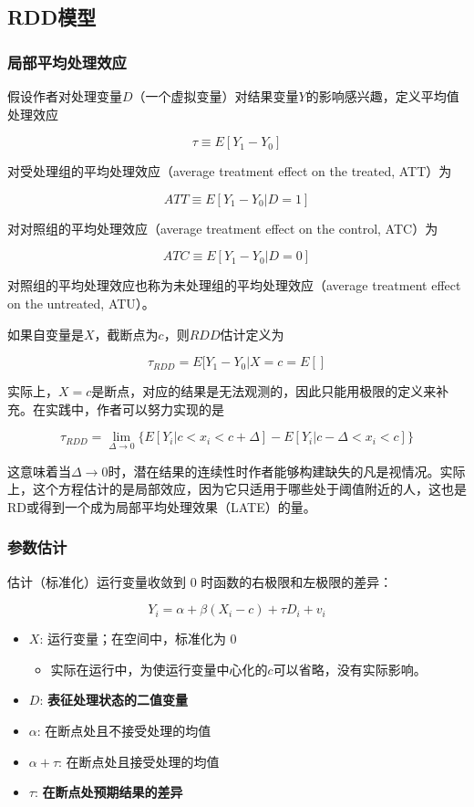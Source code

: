 \documentclass[11pt,a4paper]{ctexart}
\begin{document}
\subsection{RDD模型}

\subsubsection{局部平均处理效应}

假设作者对处理变量\(D\)（一个虚拟变量）对结果变量\(Y\)的影响感兴趣，定义平均值处理效应

\[\tau \equiv E[Y_1-Y_0]\]

对受处理组的平均处理效应（average treatment effect on the treated,
ATT）为

\[ATT \equiv E[Y_1-Y_0|D=1]\]

对对照组的平均处理效应（average treatment effect on the control, ATC）为

\[ATC\equiv E[Y_1-Y_0|D=0]\]

对照组的平均处理效应也称为未处理组的平均处理效应（average treatment
effect on the untreated, ATU）。

如果自变量是\(X\)，截断点为\(c\)，则\(RDD\)估计定义为

\[\tau_{RDD}=E[Y_1-Y_0|X=c=E[]\]

实际上，\(X=c\)是断点，对应的结果是无法观测的，因此只能用极限的定义来补充。在实践中，作者可以努力实现的是

\[\tau_{RDD} = \lim_{\Delta \to 0}\{E[Y_i|c<x_i<c+\Delta]-E[Y_i|c-\Delta<x_i<c] \}\]

这意味着当\(\Delta\to 0\)时，潜在结果的连续性时作者能够构建缺失的凡是视情况。实际上，这个方程估计的是局部效应，因为它只适用于哪些处于阈值附近的人，这也是RD或得到一个成为局部平均处理效果（LATE）的量。

\subsubsection{参数估计}

估计（标准化）运行变量收敛到 0 时函数的右极限和左极限的差异：

\[Y_i=\alpha+\beta(X_i-c)+\tau D_i+v_i\]

\begin{itemize}
\item
  \(X\): 运行变量；在空间中，标准化为 0

  \begin{itemize}
  \item
    实际在运行中，为使运行变量中心化的\(c\)可以省略，没有实际影响。
  \end{itemize}
\item
  \(D\): \textbf{表征处理状态的二值变量}
\item
  \(\alpha\): 在断点处且不接受处理的均值
\item
  \(\alpha+\tau\): 在断点处且接受处理的均值
\item
  \(\tau\): \textbf{在断点处预期结果的差异}
\end{itemize}
\end{document}
